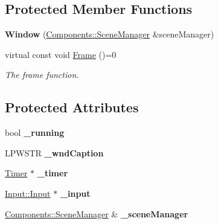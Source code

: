 \subsection*{Protected Member Functions}
\begin{DoxyCompactItemize}
\item 
{\bfseries Window} (\hyperlink{class_ensum_1_1_components_1_1_scene_manager}{Components\+::\+Scene\+Manager} \&scene\+Manager)\hypertarget{class_ensum_1_1_core_1_1_window_a64e2b8f8d5728eb941f54cc1577fcb0a}{}\label{class_ensum_1_1_core_1_1_window_a64e2b8f8d5728eb941f54cc1577fcb0a}

\item 
virtual const void \hyperlink{class_ensum_1_1_core_1_1_window_a58af9c1b06e0fe12820f584f4638ae15}{Frame} ()=0
\begin{DoxyCompactList}\small\item\em The frame function. \end{DoxyCompactList}\end{DoxyCompactItemize}
\subsection*{Protected Attributes}
\begin{DoxyCompactItemize}
\item 
bool {\bfseries \+\_\+running}\hypertarget{class_ensum_1_1_core_1_1_window_a6424445161cec33a48906e90270ba20b}{}\label{class_ensum_1_1_core_1_1_window_a6424445161cec33a48906e90270ba20b}

\item 
L\+P\+W\+S\+TR {\bfseries \+\_\+wnd\+Caption}\hypertarget{class_ensum_1_1_core_1_1_window_a42e780f298c4b0ea9f7f68f855f43e98}{}\label{class_ensum_1_1_core_1_1_window_a42e780f298c4b0ea9f7f68f855f43e98}

\item 
\hyperlink{class_ensum_1_1_core_1_1_timer}{Timer} $\ast$ {\bfseries \+\_\+timer}\hypertarget{class_ensum_1_1_core_1_1_window_aa27d25534350ec8e46cf2eae67c82ea5}{}\label{class_ensum_1_1_core_1_1_window_aa27d25534350ec8e46cf2eae67c82ea5}

\item 
\hyperlink{class_ensum_1_1_input_1_1_input}{Input\+::\+Input} $\ast$ {\bfseries \+\_\+input}\hypertarget{class_ensum_1_1_core_1_1_window_a6b2925a490f7a5a2417059660713bc19}{}\label{class_ensum_1_1_core_1_1_window_a6b2925a490f7a5a2417059660713bc19}

\item 
\hyperlink{class_ensum_1_1_components_1_1_scene_manager}{Components\+::\+Scene\+Manager} \& {\bfseries \+\_\+scene\+Manager}\hypertarget{class_ensum_1_1_core_1_1_window_a19281ff51aee4c5bd8a71f7a00786930}{}\label{class_ensum_1_1_core_1_1_window_a19281ff51aee4c5bd8a71f7a00786930}

\end{DoxyCompactItemize}
